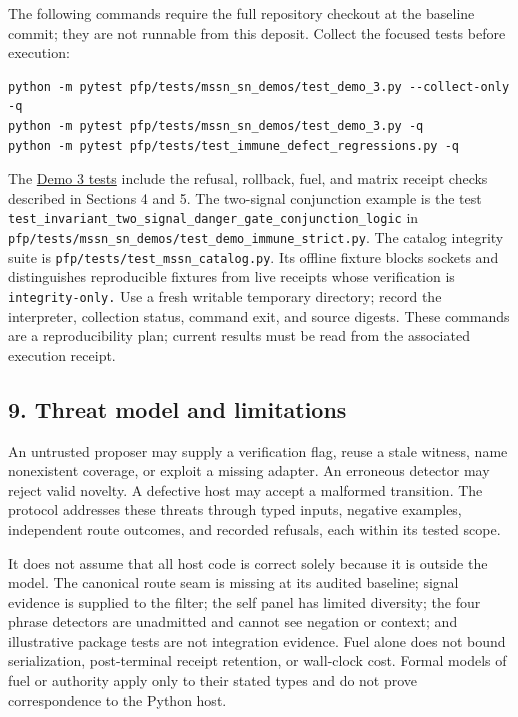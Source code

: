 \documentclass[
  11pt,
]{article}
\begin{document}
The following commands require the full repository checkout at the
baseline commit; they are not runnable from this deposit. Collect the
focused tests before execution:

\begin{lstlisting}
python -m pytest pfp/tests/mssn_sn_demos/test_demo_3.py --collect-only -q
python -m pytest pfp/tests/mssn_sn_demos/test_demo_3.py -q
python -m pytest pfp/tests/test_immune_defect_regressions.py -q
\end{lstlisting}

The
\href{https://github.com/dbccpage/the_symbol_game/blob/52cb5457f6c485ba548cfd292f6012a941ed22cf/pfp/tests/mssn_sn_demos/test_demo_3.py}{Demo
3 tests} include the refusal, rollback, fuel, and matrix receipt checks
described in Sections 4 and 5. The two-signal conjunction example is the
test \nolinkurl{test_invariant_two_signal_danger_gate_conjunction_logic}
in
\nolinkurl{pfp/tests/mssn_sn_demos/test_demo_immune_strict.py}.
The catalog integrity suite is
\nolinkurl{pfp/tests/test_mssn_catalog.py}. Its offline
fixture blocks sockets and distinguishes reproducible fixtures from live
receipts whose verification is \nolinkurl{integrity-only.} Use a fresh
writable temporary directory; record the interpreter, collection status,
command exit, and source digests. These commands are a reproducibility
plan; current results must be read from the associated execution
receipt.

\subsection{9. Threat model and
limitations}\label{threat-model-and-limitations}

An untrusted proposer may supply a verification flag, reuse a stale
witness, name nonexistent coverage, or exploit a missing adapter. An
erroneous detector may reject valid novelty. A defective host may accept
a malformed transition. The protocol addresses these threats through
typed inputs, negative examples, independent route outcomes, and
recorded refusals, each within its tested scope.

It does not assume that all host code is correct solely because it is
outside the model. The canonical route seam is missing at its audited
baseline; signal evidence is supplied to the filter; the self panel has
limited diversity; the four phrase detectors are unadmitted and cannot
see negation or context; and illustrative package tests are not
integration evidence. Fuel alone does not bound serialization,
post-terminal receipt retention, or wall-clock cost. Formal models of
fuel or authority apply only to their stated types and do not prove
correspondence to the Python host.
\end{document}
